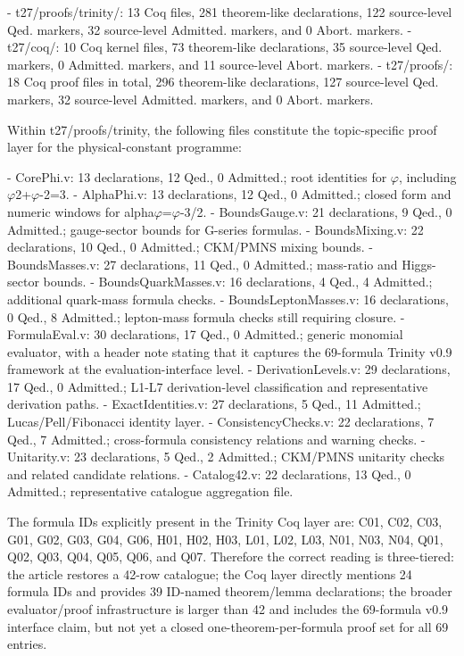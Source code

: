   - t27/proofs/trinity/: 13 Coq files, 281 theorem-like declarations, 122 source-level Qed.
  markers, 32 source-level Admitted. markers, and 0 Abort. markers.
  - t27/coq/: 10 Coq kernel files, 73 theorem-like declarations, 35 source-level Qed.
  markers, 0 Admitted. markers, and 11 source-level Abort. markers.
  - t27/proofs/: 18 Coq proof files in total, 296 theorem-like declarations, 127 source-level
  Qed. markers, 32 source-level Admitted. markers, and 0 Abort. markers.

  Within t27/proofs/trinity, the following files constitute the topic-specific proof layer for
  the physical-constant programme:

  - CorePhi.v: 13 declarations, 12 Qed., 0 Admitted.; root identities for $\varphi$, including
  $\varphi$2+$\varphi$-2=3.
  - AlphaPhi.v: 13 declarations, 12 Qed., 0 Admitted.; closed form and numeric windows
  for alpha$\varphi$=$\varphi$-3/2.
  - BoundsGauge.v: 21 declarations, 9 Qed., 0 Admitted.; gauge-sector bounds for
  G-series formulas.
  - BoundsMixing.v: 22 declarations, 10 Qed., 0 Admitted.; CKM/PMNS mixing bounds.
  - BoundsMasses.v: 27 declarations, 11 Qed., 0 Admitted.; mass-ratio and Higgs-sector
  bounds.
  - BoundsQuarkMasses.v: 16 declarations, 4 Qed., 4 Admitted.; additional quark-mass
  formula checks.
  - BoundsLeptonMasses.v: 16 declarations, 0 Qed., 8 Admitted.; lepton-mass formula
  checks still requiring closure.
  - FormulaEval.v: 30 declarations, 17 Qed., 0 Admitted.; generic monomial evaluator,
  with a header note stating that it captures the 69-formula Trinity v0.9 framework at the
  evaluation-interface level.
  - DerivationLevels.v: 29 declarations, 17 Qed., 0 Admitted.; L1-L7 derivation-level
  classification and representative derivation paths.
  - ExactIdentities.v: 27 declarations, 5 Qed., 11 Admitted.; Lucas/Pell/Fibonacci identity
  layer.
  - ConsistencyChecks.v: 22 declarations, 7 Qed., 7 Admitted.; cross-formula consistency
  relations and warning checks.
  - Unitarity.v: 23 declarations, 5 Qed., 2 Admitted.; CKM/PMNS unitarity checks and
  related candidate relations.
  - Catalog42.v: 22 declarations, 13 Qed., 0 Admitted.; representative catalogue
  aggregation file.

  The formula IDs explicitly present in the Trinity Coq layer are: C01, C02, C03, G01,
  G02, G03, G04, G06, H01, H02, H03, L01, L02, L03, N01, N03, N04, Q01, Q02, Q03,
  Q04, Q05, Q06, and Q07. Therefore the correct reading is three-tiered: the article
  restores a 42-row catalogue; the Coq layer directly mentions 24 formula IDs and
  provides 39 ID-named theorem/lemma declarations; the broader evaluator/proof
  infrastructure is larger than 42 and includes the 69-formula v0.9 interface claim, but
  not yet a closed one-theorem-per-formula proof set for all 69 entries.

